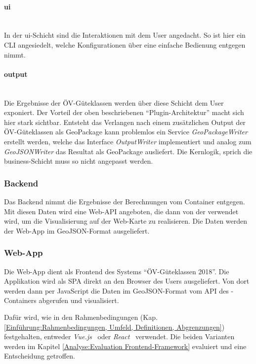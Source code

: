 \paragraph{ui}~\\
\label{layer:ui}
In der ui-Schicht sind die Interaktionen mit dem User angedacht.
So ist hier ein CLI angesiedelt, welche Konfigurationen über eine einfache Bedienung entgegen nimmt.

\paragraph{output}~\\
\label{layer:output}
Die Ergebnisse der \acs{ÖV}-Güteklassen werden über diese Schicht dem User exponiert.
Der Vorteil der oben beschriebenen "`Plugin-Architektur"' macht sich hier stark sichtbar.
Entsteht das Verlangen nach einem zusätzlichen Output der \acs{ÖV}-Güteklassen als GeoPackage kann problemlos ein Service \emph{GeoPackageWriter} erstellt werden, welche das Interface \emph{OutputWriter} implementiert und analog zum \emph{GeoJSONWriter} das Resultat als GeoPackage ausliefert.
Die Kernlogik, sprich die business-Schicht muss so nicht angepasst werden.

\subsubsection{Backend}
\label{container:Backend}

Das Backend nimmt die Ergebnisse der Berechnungen vom Container  entgegen.
Mit diesen Daten wird eine Web-\ac{API} angeboten, die dann von der  verwendet wird, um die Visualisierung auf der Web-Karte zu realisieren.
Die Daten werden der Web-App im \gls{GeoJSON}-Format ausgeliefert.


\subsubsection{Web-App}
\label{container:Web-App}

Die Web-App dient als Frontend des Systems "`\acs{ÖV}-Güteklassen 2018"'.
Die Applikation wird als \ac{SPA} direkt an den Browser des Users ausgeliefert.
Von dort werden dann per JavaScript die Daten im \gls{GeoJSON}-Format vom \ac{API} des -Containers abgerufen und visualisiert.

Dafür wird, wie in den Rahmenbedingungen (Kap. \ref{Einführung:Rahmenbedingungen, Umfeld, Definitionen, Abgrenzungen}) festgehalten, entweder \emph{Vue.js}~\cite{vuejs} oder \emph{React}~\cite{react} verwendet.
Die beiden Varianten werden im Kapitel \ref{Analyse:Evaluation Frontend-Framework} evaluiert und eine Entscheidung getroffen.

